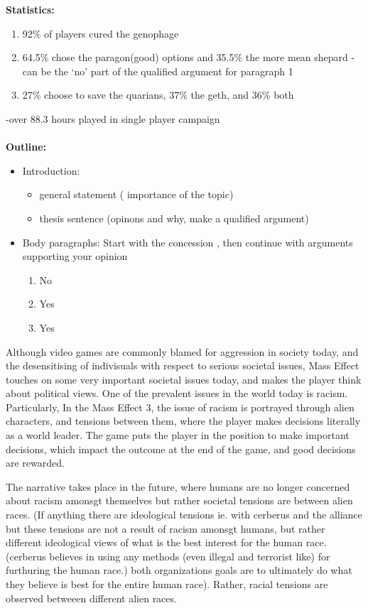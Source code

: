 \documentclass[journal]{IEEEtran}
\begin{document}
\textbf{Statistics:}
\begin{enumerate}
 \item 92\% of players cured the genophage
 \item 64.5\% chose the paragon(good) options and 35.5\% the more mean shepard - can be the `no' part of the qualified argument for paragraph 1
 \item 27\% choose to save the quarians, 37\% the geth, and 36\% both
\end{enumerate}
-over 88.3 hours played in single player campaign
\\ \\
\textbf{Outline:}
\begin{itemize}
 \item Introduction:
       \begin{itemize}
        \item general statement ( importance of the topic)
        \item thesis sentence (opinons and why, make a qualified argument)
       \end{itemize}
 \item Body paragraphs: Start with the concession , then continue with arguments supporting your opinion
       \begin{enumerate}
        \item No
        \item Yes
        \item Yes
       \end{enumerate}

\end{itemize}
Although video games are commonly blamed for aggression in society today,
and the desensitising of indivisuals with respect to serious societal issues, Mass Effect  touches on some very important societal issues today, and
makes the player think about political views. One of the prevalent issues in the world today is
racism. Particularly, In the Mass Effect 3, the issue of racism is portrayed through alien characters, and
tensions between them, where the player makes decisions literally as a world leader. The game puts the player in the position to
make important decisions, which impact the outcome at the end of the game, and good decisions are rewarded.

The narrative takes place in the future, where humans are no longer concerned about racism amonsgt themselves but rather societal
tensions are between alien races. (If anything there are ideological tensions ie. with cerberus and the alliance but these
tensions are not a result of racism amonsgt humans, but rather different ideological views of what is the best interest for the human race. (cerberus believes in using any methods (even illegal and terrorist like) for furthuring the human race.)
both organizations goals are to ultimately do what they believe is best for the entire human race). Rather, racial tensions are observed betweeen different alien races.
\end{document}
